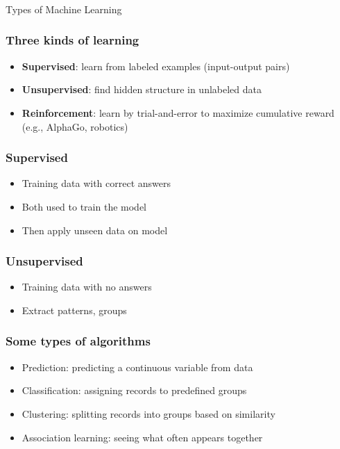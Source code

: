 \begin{frame}[fragile]\frametitle{}
\begin{center}
{\Large Types of Machine Learning}
\end{center}
\end{frame}


\begin{frame}[fragile]\frametitle{Three kinds of learning}
\begin{itemize}
\item \textbf{Supervised}: learn from labeled examples (input-output pairs)
\item \textbf{Unsupervised}: find hidden structure in unlabeled data
\item \textbf{Reinforcement}: learn by trial-and-error to maximize cumulative reward (e.g., AlphaGo, robotics)
\end{itemize}
\end{frame}


\begin{frame}[fragile]\frametitle{Supervised}
	\begin{itemize}
	\item Training data with correct answers
	\item Both used to train the model
	\item Then apply unseen data on model
	\end{itemize}
\end{frame}
\begin{frame}[fragile]\frametitle{Unsupervised}
	\begin{itemize}
	\item Training data with no answers
	\item Extract patterns, groups
	\end{itemize}	

\end{frame}

\begin{frame}[fragile]\frametitle{Some types of algorithms}
\begin{itemize}
\item Prediction: predicting a continuous variable from data
\item Classification: assigning records to predefined groups
\item Clustering: splitting records into groups based on similarity
\item Association learning: seeing what often appears together
\end{itemize}

\end{frame}


